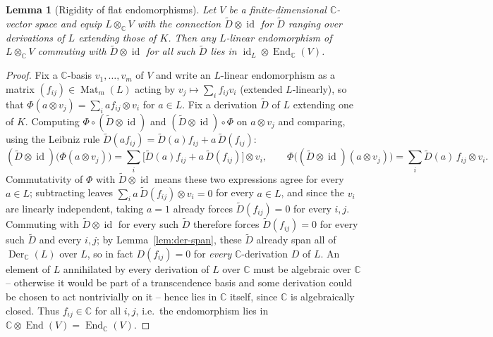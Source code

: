 \documentclass[11pt,a4paper]{article}
\newtheorem{lemma}[theorem]{Lemma}
\begin{document}
\begin{lemma}[Rigidity of flat endomorphisms]\label{lem:rigidity}
Let $V$ be a finite-dimensional $\mathbb{C}$-vector space and equip
$L \otimes_{\mathbb{C}} V$ with the connection
$\widetilde{D} \otimes \operatorname{id}$ for $\widetilde{D}$ ranging
over derivations of $L$ extending those of $K$. Then any $L$-linear
endomorphism of $L \otimes_{\mathbb{C}} V$ commuting with
$\widetilde{D} \otimes \operatorname{id}$ for all such $\widetilde{D}$
lies in $\operatorname{id}_L \otimes \operatorname{End}_{\mathbb{C}}(V)$.
\end{lemma}

\begin{proof}
Fix a $\mathbb{C}$-basis $v_1,\dots,v_m$ of $V$ and write an
$L$-linear endomorphism as a matrix $(f_{ij}) \in \operatorname{Mat}_m(L)$
acting by $v_j \mapsto \sum_i f_{ij} v_i$ (extended $L$-linearly), so
that $\Phi(a \otimes v_j) = \sum_i a f_{ij} \otimes v_i$ for $a \in L$.
Fix a derivation $\widetilde D$ of $L$ extending one of $K$. Computing
$\Phi \circ (\widetilde D \otimes \operatorname{id})$ and
$(\widetilde D \otimes \operatorname{id}) \circ \Phi$ on $a \otimes v_j$
and comparing, using the Leibniz rule
$\widetilde D(af_{ij}) = \widetilde D(a) f_{ij} + a\, \widetilde D(f_{ij})$:
\[
  (\widetilde D \otimes \operatorname{id})\big(\Phi(a \otimes v_j)\big)
  = \sum_i \big[\widetilde D(a) f_{ij} + a\, \widetilde D(f_{ij})\big] \otimes v_i,
  \qquad
  \Phi\big((\widetilde D \otimes \operatorname{id})(a \otimes v_j)\big)
  = \sum_i \widetilde D(a)\, f_{ij} \otimes v_i.
\]
Commutativity of $\Phi$ with $\widetilde D \otimes \operatorname{id}$
means these two expressions agree for every $a \in L$; subtracting
leaves $\sum_i a\, \widetilde D(f_{ij}) \otimes v_i = 0$ for every
$a \in L$, and since the $v_i$ are linearly independent, taking
$a = 1$ already forces $\widetilde D(f_{ij}) = 0$ for every $i,j$.
Commuting with $\widetilde D \otimes \operatorname{id}$ for every such
$\widetilde D$ therefore forces
$\widetilde D(f_{ij}) = 0$ for every such $\widetilde D$ and every
$i,j$; by Lemma~\ref{lem:der-span}, these $\widetilde D$ already span
all of $\operatorname{Der}_{\mathbb{C}}(L)$ over $L$, so in fact
$D(f_{ij}) = 0$ for \emph{every} $\mathbb{C}$-derivation $D$ of $L$.
An element of $L$ annihilated by every derivation of $L$ over
$\mathbb{C}$ must be algebraic over $\mathbb{C}$ -- otherwise it would
be part of a transcendence basis and some derivation could be chosen
to act nontrivially on it -- hence lies in $\mathbb{C}$ itself, since
$\mathbb{C}$ is algebraically closed. Thus $f_{ij} \in \mathbb{C}$ for
all $i,j$, i.e.\ the endomorphism lies in
$\mathbb{C} \otimes \operatorname{End}(V) = \operatorname{End}_{\mathbb{C}}(V)$.
\end{proof}
\end{document}

